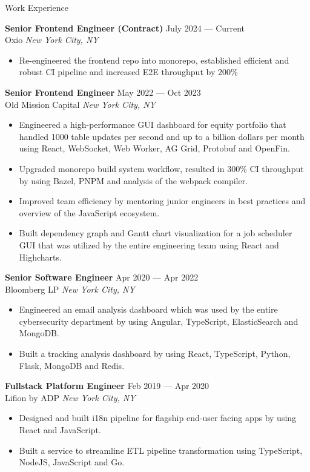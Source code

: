 \documentclass{resume} %
\begin{document}
\begin{rSection}{Work Experience}

\textbf{Senior Frontend Engineer (Contract)} \hfill July 2024 --- Current \\
Oxio \hfill \textit{New York City, NY}
\begin{itemize}
    \item {Re-engineered the frontend repo into monorepo, established efficient and robust CI pipeline and increased E2E throughput by 200\%}
\end{itemize}

\textbf{Senior Frontend Engineer} \hfill May 2022 --- Oct 2023 \\
Old Mission Capital \hfill \textit{New York City, NY}
\begin{itemize}
    \item {Engineered a high-performance GUI dashboard for equity portfolio that handled 1000 table updates per second and up to a billion dollars per month using React, WebSocket, Web Worker, AG Grid, Protobuf and OpenFin.}
    \item {Upgraded monorepo build system workflow, resulted in 300\% CI throughput by using Bazel, PNPM and analysis of the webpack compiler.}
    \item {Improved team efficiency by mentoring junior engineers in best practices and overview of the JavaScript ecosystem.}
    \item {Built dependency graph and Gantt chart visualization for a job scheduler GUI that was utilized by the entire engineering team using React and Highcharts.}
\end{itemize}

\textbf{Senior Software Engineer} \hfill Apr 2020 --- Apr 2022 \\
Bloomberg LP \hfill \textit{New York City, NY}
\begin{itemize}
    \item {Engineered an email analysis dashboard which was used by the entire cybersecurity department by using Angular, TypeScript, ElasticSearch and MongoDB.}
    \item {Built a tracking analysis dashboard by using React, TypeScript, Python, Flask, MongoDB and Redis.}
\end{itemize}

\textbf{Fullstack Platform Engineer} \hfill Feb 2019 --- Apr 2020 \\
Lifion by ADP \hfill \textit{New York City, NY}
\begin{itemize}
    \item {Designed and built i18n pipeline for flagship end-user facing apps by using React and JavaScript.}
    \item {Built a service to streamline ETL pipeline transformation using TypeScript, NodeJS, JavaScript and Go.}
\end{itemize}


\end{rSection}
\end{document}
